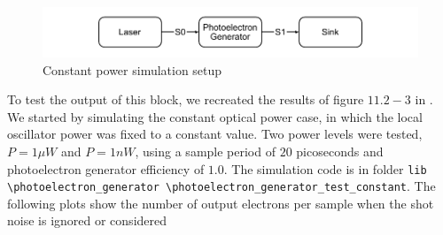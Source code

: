 \begin{figure}[h]
	\centering
	\includegraphics{./lib/photoelectron_generator/figures/scheme_simulation_constant.pdf}
	\caption{Constant power simulation setup}
\end{figure}

To test the output of this block, we recreated the results of figure $11.2-3$ in \cite{saleh1991}.
We started by simulating the constant optical power case, in which the local oscillator power was fixed to a constant value.
Two power levels were tested, $P = 1 \mu W$ and $P = 1 nW$, using a sample period of $20$ picoseconds and photoelectron generator efficiency of $1.0$.
The simulation code is in folder \texttt{lib \textbackslash photoelectron\_generator \textbackslash photoelectron\_generator\_test\_constant}.
The following plots show the number of output electrons per sample when the shot noise is ignored or considered


